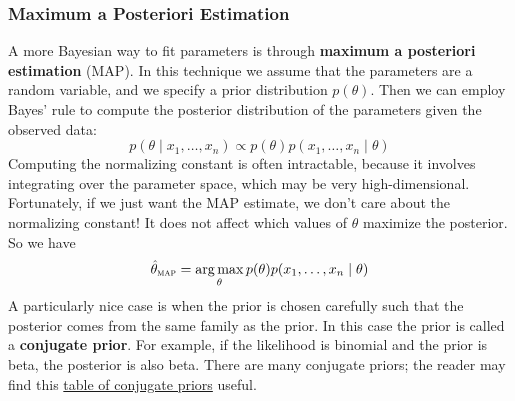 \documentclass{article}
\DeclareMathOperator*{\argmax}{arg\,max}
\newcommand{\term}[1]{\textbf{#1}}
\begin{document}
\subsubsection{Maximum a Posteriori Estimation}
A more Bayesian way to fit parameters is through \term{maximum a posteriori estimation} (MAP). In this technique we assume that the parameters are a random variable, and we specify a prior distribution $p(\theta)$. Then we can employ Bayes' rule to compute the posterior distribution of the parameters given the observed data:
\[p(\theta \mid x_1, \dots, x_n) \propto p(\theta)p(x_1, \dots, x_n \mid \theta)\]
Computing the normalizing constant is often intractable, because it involves integrating over the parameter space, which may be very high-dimensional. Fortunately, if we just want the MAP estimate, we don't care about the normalizing constant! It does not affect which values of $\theta$ maximize the posterior. So we have
\[\hat{\theta}_\textsc{map} = \argmax_\theta p(\theta)p(x_1, \dots, x_n \mid \theta)\]
A particularly nice case is when the prior is chosen carefully such that the posterior comes from the same family as the prior. In this case the prior is called a \term{conjugate prior}. For example, if the likelihood is binomial and the prior is beta, the posterior is also beta. There are many conjugate priors; the reader may find this \href{https://en.wikipedia.org/wiki/Conjugate_prior#Table_of_conjugate_distributions}{table of conjugate priors} useful.

\newpage


\nocite{*}
\end{document}
